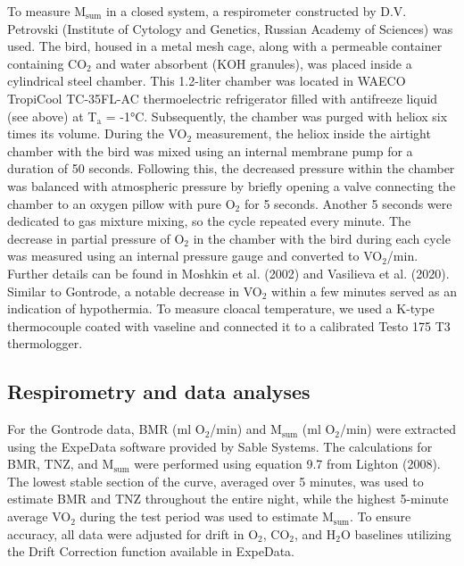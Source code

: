 \documentclass[10pt, twoside]{book} %
\begin{document}
To measure M$_{\text{sum}}$ in a closed system, a respirometer constructed by D.V. Petrovski (Institute of Cytology and Genetics, Russian Academy of Sciences) was used. The bird, housed in a metal mesh cage, along with a permeable container containing CO$_{\text{2}}$ and water absorbent (KOH granules), was placed inside a cylindrical steel chamber. This 1.2-liter chamber was located in WAECO TropiCool TC-35FL-AC thermoelectric refrigerator filled with antifreeze liquid (see above) at T$_{\text{a}}$ = -1°C. Subsequently, the chamber was purged with heliox six times its volume. During the VO$_{\text{2}}$ measurement, the heliox inside the airtight chamber with the bird was mixed using an internal membrane pump for a duration of 50 seconds. Following this, the decreased pressure within the chamber was balanced with atmospheric pressure by briefly opening a valve connecting the chamber to an oxygen pillow with pure O$_{\text{2}}$ for 5 seconds. Another 5 seconds were dedicated to gas mixture mixing, so the cycle repeated every minute. The decrease in partial pressure of O$_{\text{2}}$ in the chamber with the bird during each cycle was measured using an internal pressure gauge and converted to VO$_{\text{2}}$/min. Further details can be found in Moshkin et al. (2002) and Vasilieva et al. (2020). Similar to Gontrode, a notable decrease in VO$_{\text{2}}$ within a few minutes served as an indication of hypothermia. To measure cloacal temperature, we used a K-type thermocouple coated with vaseline and connected it to a calibrated Testo 175 T3 thermologger.\\

\subsection{Respirometry and data analyses}

For the Gontrode data, BMR (ml O$_{\text{2}}$/min) and M$_{\text{sum}}$ (ml O$_{\text{2}}$/min) were extracted using the ExpeData software provided by Sable Systems. The calculations for BMR, TNZ, and M$_{\text{sum}}$ were performed using equation 9.7 from Lighton (2008). The lowest stable section of the curve, averaged over 5 minutes, was used to estimate BMR and TNZ throughout the entire night, while the highest 5-minute average VO$_{\text{2}}$ during the test period was used to estimate M$_{\text{sum}}$. To ensure accuracy, all data were adjusted for drift in O$_{\text{2}}$, CO$_{\text{2}}$, and H$_{\text{2}}$O baselines utilizing the Drift Correction function available in ExpeData.\\
\end{document}
